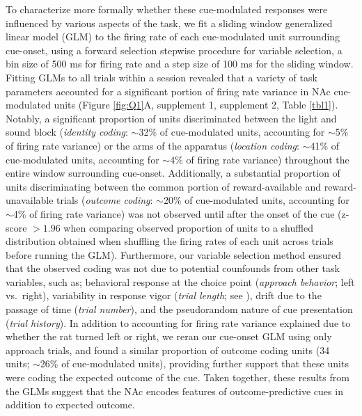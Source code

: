 \documentclass[11pt]{article}
\let\citeNP=\citealt
\begin{document}
To characterize more formally whether these cue-modulated responses were influenced by various aspects of the task, we fit a sliding window generalized linear model (GLM) to the firing rate of each cue-modulated unit surrounding cue-onset, using a forward selection stepwise procedure for variable selection, a bin size of 500 ms for firing rate and a step size of 100 ms for the sliding window. Fitting GLMs to all trials within a session revealed that a variety of task parameters accounted for a significant portion of firing rate variance in NAc cue-modulated units (Figure \ref{fig:Q1}A, supplement 1, supplement 2, Table \ref{tbl1}). Notably, a significant proportion of units discriminated between the light and sound block ({\it identity coding}: $\sim$32\% of cue-modulated units, accounting for $\sim$5\% of firing rate variance) or the arms of the apparatus ({\it location coding}: $\sim$41\% of cue-modulated units, accounting for $\sim$4\% of firing rate variance) throughout the entire window surrounding cue-onset. Additionally, a substantial proportion of units discriminating between the common portion of reward-available and reward-unavailable trials ({\it outcome coding}: $\sim$20\% of cue-modulated units, accounting for $\sim$4\% of firing rate variance) was not observed until after the onset of the cue (z-score $>1.96$ when comparing observed proportion of units to a shuffled distribution obtained when shuffling the firing rates of each unit across trials before running the GLM). Furthermore, our variable selection method ensured that the observed coding was not due to potential counfounds from other task variables, such as; behavioral response at the choice point ({\it approach behavior}; left vs.\ right), variability in response vigor ({\it trial length}; see \citeNP{McGinty2013}), drift due to the passage of time ({\it trial number}), and the pseudorandom nature of cue presentation ({\it trial history}). In addition to accounting for firing rate variance explained due to whether the rat turned left or right, we reran our cue-onset GLM using only approach trials, and found a similar proportion of outcome coding units (34 units; $\sim$26\% of cue-modulated units), providing further support that these units were coding the expected outcome of the cue. Taken together, these results from the GLMs suggest that the NAc encodes features of outcome-predictive cues in addition to expected outcome. 
\end{document}
